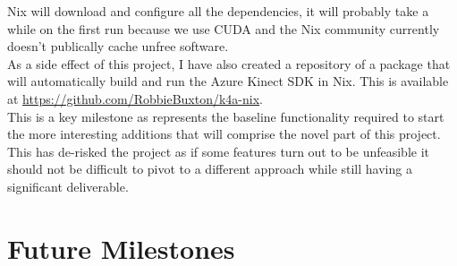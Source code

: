 
Nix will download and configure all the dependencies, it will probably take a while on the first run because we use CUDA and the Nix community currently doesn't publically cache unfree software. \\

As a side effect of this project, I have also created a repository of a package that will automatically build and run the Azure Kinect SDK in Nix. This is available at \url{https://github.com/RobbieBuxton/k4a-nix}. \\

This is a key milestone as represents the baseline functionality required to start the more interesting additions that will comprise the novel part of this project. This has de-risked the project as if some features turn out to be unfeasible it should not be difficult to pivot to a different approach while still having a significant deliverable.

\section{Future Milestones}
